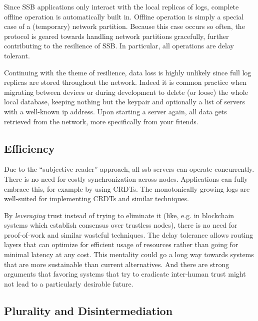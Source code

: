 \documentclass[10pt,sigconf]{acmart}
\begin{document}
Since SSB applications only interact with the local replicas of logs, complete offline operation is automatically built in. Offline operation is simply a special case of a (temporary) network partition. Because this case occurs so often, the protocol is geared towards handling network partitions gracefully, further contributing to the resilience of SSB. In particular, all operations are delay tolerant.

Continuing with the theme of resilience, data loss is highly unlikely since full log replicas are stored throughout the network. Indeed it is common practice when migrating between devices or during development to delete (or loose) the whole local database, keeping nothing but the keypair and optionally a list of servers with a well-known ip address. Upon starting a server again, all data gets retrieved from the network, more specifically from your friends.



\subsection{Efficiency}

Due to the ``subjective reader'' approach, all ssb servers can operate concurrently. There is no need for costly synchronization across nodes. Applications can fully embrace this, for example by using CRDTs. The monotonically growing logs are well-suited for implementing CRDTs and similar techniques.

By {\em leveraging} trust instead of trying to eliminate it (like, e.g. in blockchain systems which establish consensus over trustless nodes), there is no need for proof-of-work and similar wasteful techniques. The delay tolerance allows routing layers that can optimize for efficient usage of resources rather than going for minimal latency at any cost. This mentality could go a long way towards systems that are more sustainable than current alternatives. And there are strong arguments that favoring systems that try to eradicate inter-human trust might not lead to a particularly desirable future.

\subsection{Plurality and Disintermediation}
\end{document}
